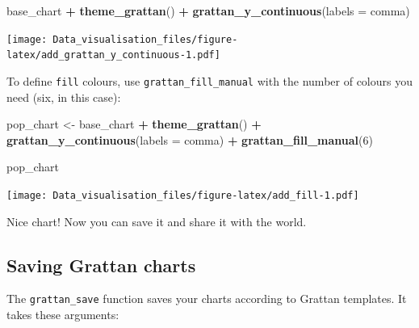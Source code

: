 \documentclass[]{book}
\newenvironment{Shaded}{\begin{snugshade}}{\end{snugshade}}
\newcommand{\DataTypeTok}[1]{\textcolor[rgb]{0.13,0.29,0.53}{#1}}
\newcommand{\DecValTok}[1]{\textcolor[rgb]{0.00,0.00,0.81}{#1}}
\newcommand{\KeywordTok}[1]{\textcolor[rgb]{0.13,0.29,0.53}{\textbf{#1}}}
\newcommand{\NormalTok}[1]{#1}
\newcommand{\OperatorTok}[1]{\textcolor[rgb]{0.81,0.36,0.00}{\textbf{#1}}}
\newcommand{\StringTok}[1]{\textcolor[rgb]{0.31,0.60,0.02}{#1}}
\begin{document}
\begin{Shaded}
\begin{Highlighting}[]
\NormalTok{base_chart }\OperatorTok{+}
\StringTok{        }\KeywordTok{theme_grattan}\NormalTok{() }\OperatorTok{+}
\StringTok{        }\KeywordTok{grattan_y_continuous}\NormalTok{(}\DataTypeTok{labels =}\NormalTok{ comma)}
\end{Highlighting}
\end{Shaded}

\texttt{[image: Data\_visualisation\_files/figure-latex/add\_grattan\_y\_continuous-1.pdf]}

To define \texttt{fill} colours, use \texttt{grattan\_fill\_manual} with the number of colours you need (six, in this case):

\begin{Shaded}
\begin{Highlighting}[]
\NormalTok{pop_chart <-}\StringTok{ }\NormalTok{base_chart }\OperatorTok{+}
\StringTok{        }\KeywordTok{theme_grattan}\NormalTok{() }\OperatorTok{+}
\StringTok{        }\KeywordTok{grattan_y_continuous}\NormalTok{(}\DataTypeTok{labels =}\NormalTok{ comma) }\OperatorTok{+}
\StringTok{        }\KeywordTok{grattan_fill_manual}\NormalTok{(}\DecValTok{6}\NormalTok{)}

\NormalTok{pop_chart}
\end{Highlighting}
\end{Shaded}

\texttt{[image: Data\_visualisation\_files/figure-latex/add\_fill-1.pdf]}

Nice chart! Now you can save it and share it with the world.

\hypertarget{saving-grattan-charts}{%
\subsection{Saving Grattan charts}\label{saving-grattan-charts}}

The \texttt{grattan\_save} function saves your charts according to Grattan templates. It takes these arguments:
\end{document}
